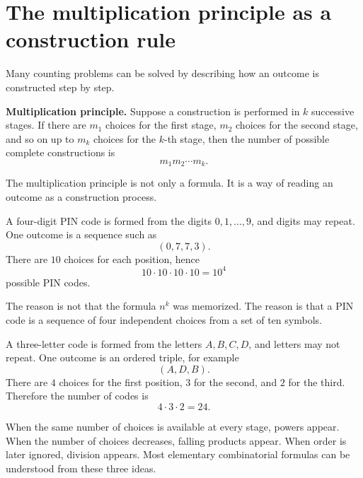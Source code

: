 \section{The multiplication principle as a construction rule}

Many counting problems can be solved by describing how an outcome is constructed step by step.

\begin{theorembox}
\textbf{Multiplication principle.} Suppose a construction is performed in \(k\) successive stages. If there are \(m_1\) choices for the first stage, \(m_2\) choices for the second stage, and so on up to \(m_k\) choices for the \(k\)-th stage, then the number of possible complete constructions is
\[
m_1m_2\cdots m_k.
\]
\end{theorembox}

The multiplication principle is not only a formula. It is a way of reading an outcome as a construction process.

\begin{examplebox}
A four-digit PIN code is formed from the digits \(0,1,\ldots,9\), and digits may repeat. One outcome is a sequence such as
\[
(0,7,7,3).
\]
There are \(10\) choices for each position, hence
\[
10\cdot 10\cdot 10\cdot 10=10^4
\]
possible PIN codes.

The reason is not that the formula \(n^k\) was memorized. The reason is that a PIN code is a sequence of four independent choices from a set of ten symbols.
\end{examplebox}

\begin{examplebox}
A three-letter code is formed from the letters \(A,B,C,D\), and letters may not repeat. One outcome is an ordered triple, for example
\[
(A,D,B).
\]
There are \(4\) choices for the first position, \(3\) for the second, and \(2\) for the third. Therefore the number of codes is
\[
4\cdot 3\cdot 2=24.
\]
\end{examplebox}

When the same number of choices is available at every stage, powers appear. When the number of choices decreases, falling products appear. When order is later ignored, division appears. Most elementary combinatorial formulas can be understood from these three ideas.

